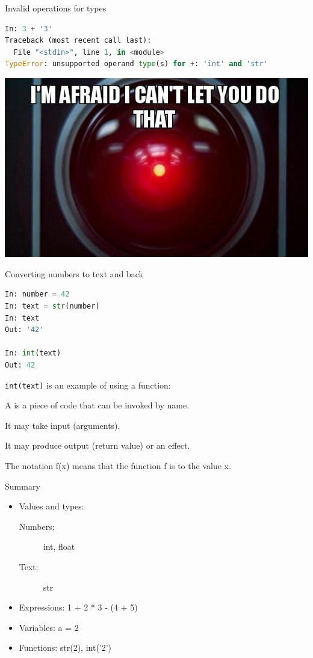 \documentclass[aspectratio=169,usenames,dvipsnames]{beamer}
\begin{document}
\begin{frame}[fragile]{Invalid operations for types}
\begin{lstlisting}[language=python]
In: 3 + '3'
Traceback (most recent call last):
  File "<stdin>", line 1, in <module>
TypeError: unsupported operand type(s) for +: 'int' and 'str'
\end{lstlisting}
    
    \centering
    \includegraphics[height=0.5\textheight]{fig/cantdothat}
\end{frame}
    

\begin{frame}[fragile]{Converting numbers to text and back}
\begin{lstlisting}[language=python]
In: number = 42
In: text = str(number)
In: text
Out: '42'

In: int(text)
Out: 42
\end{lstlisting}

    \texttt{int(text)} is an example of using a function:

    \begin{definition}
        A  is a piece of code
        that can be invoked by name.

        It may take input (arguments).
        
        It may produce output (return value) or an effect.

        The notation f(x) means that the function f
        is  to the value x.
    \end{definition}

\end{frame}


\begin{frame}{Summary}
    \begin{itemize}
        \item Values and types:
            \begin{description}
                \item[Numbers:] int, float
                \item[Text:] str
            \end{description}
        \item Expressions: 1 + 2 * 3 - (4 + 5)
        \item Variables: a = 2
        \item Functions: str(2), int('2')
    \end{itemize}
\end{frame}
\end{document}
